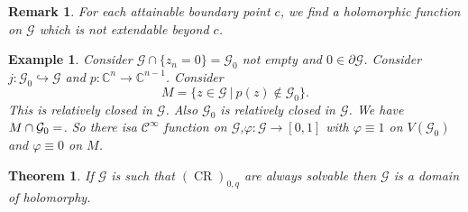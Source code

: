 \documentclass{article}
\newtheorem{theorem}{Theorem} [section]
\newtheorem{remark}{Remark}[section]
\newtheorem{example}{Example}[section]
\DeclareMathOperator{\CR}{CR}
\newcommand{\C}[0]{\mathbb{C}}
\newcommand{\G}[0]{\mathcal{G}}
\newcommand{\sep}[0]{\:|\:}
\newcommand{\bd}[0]{\partial}
\newcommand{\ck}[1]{\mathcal{C}^{#1}}
\newcommand{\cinf}[0]{\ck{\infty}}
\begin{document}
\begin{remark}
  For each attainable boundary point $c$, we find a holomorphic function on $\G$ which is not extendable beyond $c$. 
\end{remark}

\begin{example}
  Consider $\G\cap\{z_n=0\} = \G_0$ not empty and $0\in\bd\G$. Consider $j:\G_0\hookrightarrow\G$ and $p:\C^n\to\C^{n-1}$. Consider 
  \begin{equation*}
    M = \{z\in\G\sep p(z)\not\in\G_0\}.
  \end{equation*}
  This is relatively closed in $\G$. Also $\G_0$ is relatively closed in $\G$. We have $M\cap\G_0=\empty$. So there isa $\cinf$ function on $\G$,$\varphi:\G\to[0,1]$ with $\varphi \equiv1$ on $V(\G_0)$ and $\varphi\equiv0$ on $M$.
\end{example}

\begin{theorem}
  \label{theorem_2_3_cr}If $\G$ is such that $(\CR)_{0,q}$ are always solvable then $\G$ is a domain of holomorphy.
\end{theorem}
\end{document}
